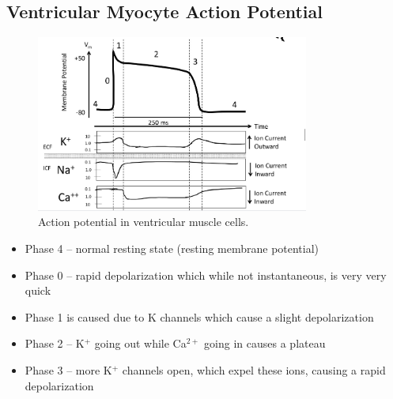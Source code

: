 \documentclass[10pt]{article}
\begin{document}
\subsection{Ventricular Myocyte Action Potential}
\begin{figure}[H]
    \centering
    \includegraphics[width=0.8\textwidth]{ventricularExcitation}
    \caption{Action potential in ventricular muscle cells.}
    \label{fig:ventricularExcitation}
\end{figure}
\begin{itemize}
    \item Phase 4 -- normal resting state (resting membrane potential)
    \item Phase 0 -- rapid depolarization which while not instantaneous, is very very quick
    \item Phase 1 is caused due to K channels which cause a slight depolarization
    \item Phase 2 -- K$^+$ going out while Ca$^{2+}$ going in causes a plateau
    \item Phase 3 -- more K$^+$ channels open, which expel these ions, causing a rapid depolarization
\end{itemize}
\end{document}
